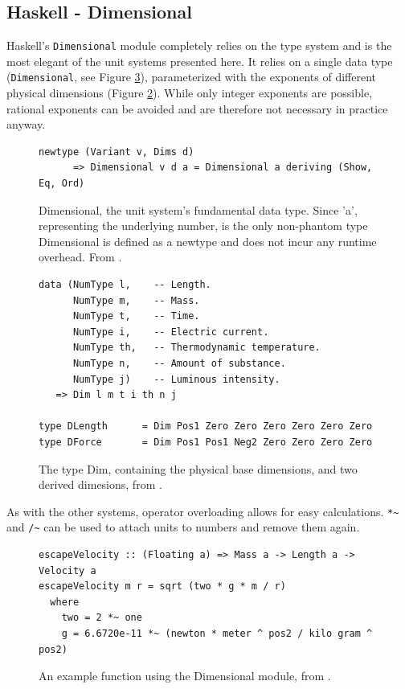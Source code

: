 \documentclass[12pt,oneside,a4paper]{scrbook}
\begin{document}
\subsection{Haskell - Dimensional}
Haskell's \verb/Dimensional/ module \citep{Buckwalter06} completely relies on the type system and is the most elegant of the unit systems presented here. It relies on a single data type (\verb/Dimensional/, see Figure \ref{code:haskell_dimensional}), parameterized with the exponents of different physical dimensions (Figure \ref{code:haskell_dim}). While only integer exponents are possible, rational exponents can be avoided and are therefore not necessary in practice anyway.

\begin{figure}
\begin{verbatim}
newtype (Variant v, Dims d)
      => Dimensional v d a = Dimensional a deriving (Show, Eq, Ord)
\end{verbatim}
\caption{Dimensional, the unit system's fundamental data type. Since 'a', representing the underlying number, is the only non-phantom type Dimensional is defined as a newtype and does not incur any runtime overhead. From \citep{Buckwalter06}.}
\label{code:haskell_dimensional}
\end{figure}



\begin{figure}
\begin{verbatim}
data (NumType l,    -- Length.
      NumType m,    -- Mass.
      NumType t,    -- Time.
      NumType i,    -- Electric current.
      NumType th,   -- Thermodynamic temperature.
      NumType n,    -- Amount of substance.
      NumType j)    -- Luminous intensity.
   => Dim l m t i th n j

type DLength      = Dim Pos1 Zero Zero Zero Zero Zero Zero
type DForce       = Dim Pos1 Pos1 Neg2 Zero Zero Zero Zero
\end{verbatim}
\caption{The type Dim, containing the physical base dimensions, and two derived dimesions, from \citep{Buckwalter06}.}
\label{code:haskell_dim}
\end{figure}


As with the other systems, operator overloading allows for easy calculations. \verb/*~/ and \verb|/~| can be used to attach units to numbers and remove them again.


\begin{figure}
\begin{verbatim}
escapeVelocity :: (Floating a) => Mass a -> Length a -> Velocity a
escapeVelocity m r = sqrt (two * g * m / r)
  where
    two = 2 *~ one
    g = 6.6720e-11 *~ (newton * meter ^ pos2 / kilo gram ^ pos2)
\end{verbatim}
\caption{An example function using the Dimensional module, from \citep{Buckwalter06}.}
\label{code:haskell_dimensional}
\end{figure}
\end{document}

